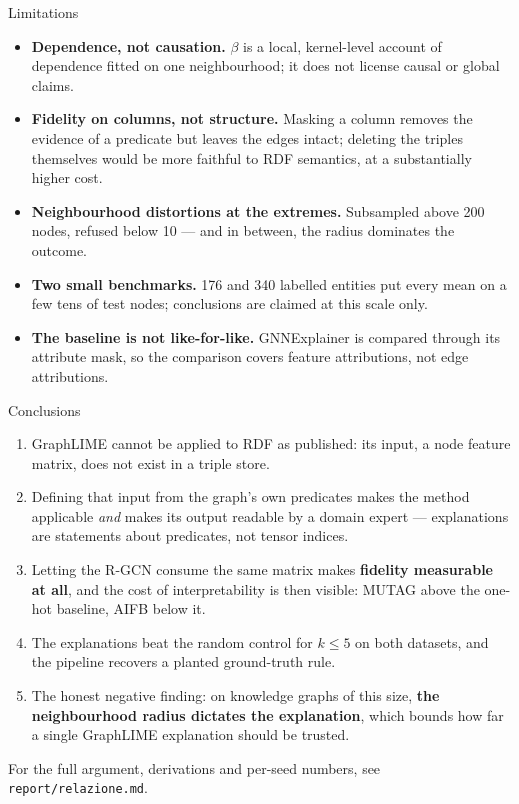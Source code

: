 \documentclass[10pt,aspectratio=169]{beamer}
\begin{document}
\begin{frame}{Limitations}
  \begin{itemize}
    \item \textbf{Dependence, not causation.} $\beta$ is a local,
      kernel-level account of dependence fitted on one neighbourhood; it
      does not license causal or global claims.
    \item \textbf{Fidelity on columns, not structure.} Masking a column
      removes the evidence of a predicate but leaves the edges intact;
      deleting the triples themselves would be more faithful to RDF
      semantics, at a substantially higher cost.
    \item \textbf{Neighbourhood distortions at the extremes.} Subsampled
      above 200 nodes, refused below 10 --- and in between, the radius
      dominates the outcome.
    \item \textbf{Two small benchmarks.} 176 and 340 labelled entities put
      every mean on a few tens of test nodes; conclusions are claimed at
      this scale only.
    \item \textbf{The baseline is not like-for-like.} GNNExplainer is
      compared through its attribute mask, so the comparison covers feature
      attributions, not edge attributions.
  \end{itemize}
\end{frame}

\begin{frame}{Conclusions}
  \begin{enumerate}
    \item GraphLIME cannot be applied to RDF as published: its input, a node
      feature matrix, \alert{does not exist} in a triple store.
    \item Defining that input from the graph's own predicates makes the
      method applicable \emph{and} makes its output readable by a domain
      expert --- explanations are statements about predicates, not tensor
      indices.
    \item Letting the R-GCN consume the same matrix makes \textbf{fidelity
      measurable at all}, and the cost of interpretability is then visible:
      MUTAG above the one-hot baseline, AIFB below it.
    \item The explanations beat the random control for $k \le 5$ on both
      datasets, and the pipeline recovers a planted ground-truth rule.
    \item The honest negative finding: on knowledge graphs of this size,
      \textbf{the neighbourhood radius dictates the explanation}, which
      bounds how far a single GraphLIME explanation should be trusted.
  \end{enumerate}

  \vfill
  \centering
  \footnotesize
  For the full argument, derivations and per-seed numbers, see
  \texttt{report/relazione.md}.
\end{frame}
\end{document}
